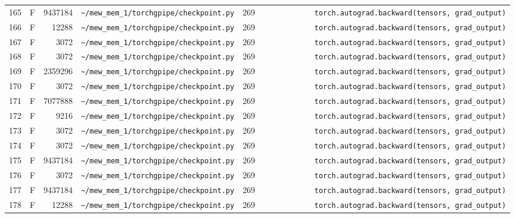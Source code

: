 \documentclass{article}
\begin{document}
\begin{longtable}{r l r p{6.5cm} r p{7.0cm}}
165 & F & 9437184 & \lstinline|~/mew_mem_1/torchgpipe/checkpoint.py| & 269 & \lstinline|            torch.autograd.backward(tensors, grad_output)| \\
166 & F & 12288 & \lstinline|~/mew_mem_1/torchgpipe/checkpoint.py| & 269 & \lstinline|            torch.autograd.backward(tensors, grad_output)| \\
167 & F & 3072 & \lstinline|~/mew_mem_1/torchgpipe/checkpoint.py| & 269 & \lstinline|            torch.autograd.backward(tensors, grad_output)| \\
168 & F & 3072 & \lstinline|~/mew_mem_1/torchgpipe/checkpoint.py| & 269 & \lstinline|            torch.autograd.backward(tensors, grad_output)| \\
169 & F & 2359296 & \lstinline|~/mew_mem_1/torchgpipe/checkpoint.py| & 269 & \lstinline|            torch.autograd.backward(tensors, grad_output)| \\
170 & F & 3072 & \lstinline|~/mew_mem_1/torchgpipe/checkpoint.py| & 269 & \lstinline|            torch.autograd.backward(tensors, grad_output)| \\
171 & F & 7077888 & \lstinline|~/mew_mem_1/torchgpipe/checkpoint.py| & 269 & \lstinline|            torch.autograd.backward(tensors, grad_output)| \\
172 & F & 9216 & \lstinline|~/mew_mem_1/torchgpipe/checkpoint.py| & 269 & \lstinline|            torch.autograd.backward(tensors, grad_output)| \\
173 & F & 3072 & \lstinline|~/mew_mem_1/torchgpipe/checkpoint.py| & 269 & \lstinline|            torch.autograd.backward(tensors, grad_output)| \\
174 & F & 3072 & \lstinline|~/mew_mem_1/torchgpipe/checkpoint.py| & 269 & \lstinline|            torch.autograd.backward(tensors, grad_output)| \\
175 & F & 9437184 & \lstinline|~/mew_mem_1/torchgpipe/checkpoint.py| & 269 & \lstinline|            torch.autograd.backward(tensors, grad_output)| \\
176 & F & 3072 & \lstinline|~/mew_mem_1/torchgpipe/checkpoint.py| & 269 & \lstinline|            torch.autograd.backward(tensors, grad_output)| \\
177 & F & 9437184 & \lstinline|~/mew_mem_1/torchgpipe/checkpoint.py| & 269 & \lstinline|            torch.autograd.backward(tensors, grad_output)| \\
178 & F & 12288 & \lstinline|~/mew_mem_1/torchgpipe/checkpoint.py| & 269 & \lstinline|            torch.autograd.backward(tensors, grad_output)| \\

\end{longtable}
\end{document}
